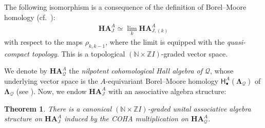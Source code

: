 \documentclass[reqno,a4paper]{amsart}
\newcommand{\N}{\mathbb{N}}
\newcommand{\Z}{\mathbb{Z}}
\newcommand{\dLambda}{\mathbf{\Lambda}}
\newcommand{\qv}{\mathcal{Q}}
\newcommand{\HBMbulletA}{\mathsf{H}_\bullet^A}
\newcommand{\coha}{\mathbf{HA}}
\theoremstyle{basic-theorem}
\newtheorem{theorem}{Theorem}[section]
\numberwithin{equation}{section}
\begin{document}
The following isomorphism is a consequence of the definition of Borel--Moore homology (cf.\ \cite[\S\ref*{foundations-sec:BM-homology}]{DPSSV-1}):
\begin{align}
	\coha_J^A\simeq \lim_k \coha_{J, (k)}^A
\end{align}
with respect to the maps $\rho_{k,k-1}$, where the limit is equipped with the \textit{quasi-compact topology}. This is a topological $(\N \times \Z I)$-graded vector space.

We denote by $\coha_\qv^A$ the \textit{nilpotent cohomological Hall algebra of $\qv$}, whose underlying vector space is the $A$-equivariant Borel--Moore homology $\HBMbulletA(\dLambda_\qv)$ of $\dLambda_\qv$ (see \cite[\S\ref*{COHA-Yangian-sec:nilpotent-quiver-COHA}]{DPSSV-3}). Now, we endow $\coha_J^A$ with an associative algebra structure:
\begin{theorem}\label{thm:coha-surface-as-limit1}
	There is a canonical $(\N \times \Z I)$-graded unital associative algebra structure on $\coha_J^A$ induced by the COHA multiplication on $\coha_\qv^A$.
\end{theorem}
\end{document}
